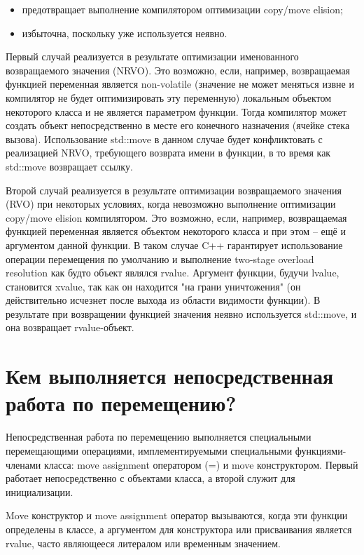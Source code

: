 \documentclass[a4paper,12pt]{article}	%
\begin{document}
	\begin{itemize}
	
	\item предотвращает выполнение компилятором оптимизации copy/move elision;
	
	\item избыточна, поскольку уже используется неявно.	
	
	\end{itemize}
	
	Первый случай реализуется в результате оптимизации именованного возвращаемого значения (NRVO). Это возможно, если, например, возвращаемая функцией переменная является non-volatile (значение не может меняться извне и компилятор не будет оптимизировать эту переменную) локальным объектом некоторого класса и не является параметром функции. Тогда компилятор может создать объект непосредственно в месте его конечного назначения (ячейке стека вызова). Использование std::move в данном случае будет конфликтовать с реализацией NRVO, требующего возврата имени в функции, в то время как std::move возвращает ссылку.
	
	Второй случай реализуется в результате оптимизации возвращаемого значения (RVO) при некоторых условиях, когда невозможно выполнение оптимизации copy/move elision компилятором. Это возможно, если, например, возвращаемая функцией переменная является объектом некоторого класса и при этом -- ещё и аргументом данной функции. В таком случае C++ гарантирует использование операции перемещения по умолчанию и выполнение two-stage overload resolution как будто объект являлся rvalue. Аргумент функции, будучи lvalue, становится xvalue, так как он находится "на грани уничтожения" (он действительно исчезнет после выхода из области видимости функции). В результате при возвращении функцией значения неявно используется std::move, и она возвращает rvalue-объект.
	
\newpage

\section{Кем выполняется непосредственная работа по перемещению?}

	Непосредственная работа по перемещению выполняется специальными перемещающими операциями, имплементируемыми специальными функциями-членами класса: move assignment оператором (=) и move конструктором. Первый работает непосредственно с объектами класса, а второй служит для инициализации.
	
	Move конструктор и move assignment оператор вызываются, когда эти функции определены в классе, а аргументом для конструктора или присваивания является rvalue, часто являющееся литералом или временным значением.
\end{document}
